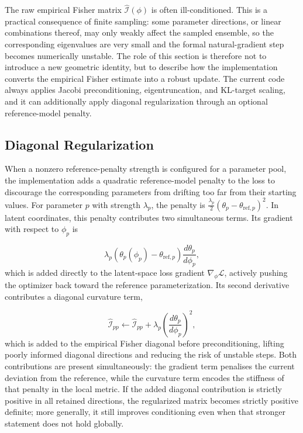 The raw empirical Fisher matrix $\widehat{\mathcal{I}}(\phi)$ is often ill-conditioned. This is a practical consequence of finite sampling: some parameter directions, or linear combinations thereof, may only weakly affect the sampled ensemble, so the corresponding eigenvalues are very small and the formal natural-gradient step becomes numerically unstable. The role of this section is therefore not to introduce a new geometric identity, but to describe how the implementation converts the empirical Fisher estimate into a robust update. The current code always applies Jacobi preconditioning, eigentruncation, and KL-target scaling, and it can additionally apply diagonal regularization through an optional reference-model penalty.

\subsection{Diagonal Regularization}

When a nonzero reference-penalty strength is configured for a parameter pool, the implementation adds a quadratic reference-model penalty to the loss to discourage the corresponding parameters from drifting too far from their starting values. For parameter $p$ with strength $\lambda_p$, the penalty is $\tfrac{\lambda_p}{2}(\theta_p - \theta_{\mathrm{ref},p})^2$. In latent coordinates, this penalty contributes two simultaneous terms. Its gradient with respect to $\phi_p$ is

\begin{equation}
    \lambda_p \left(\theta_p(\phi_p) - \theta_{\mathrm{ref},p}\right) \frac{d\theta_p}{d\phi_p},
    \label{eq:refpengrad}
\end{equation}
%
which is added directly to the latent-space loss gradient $\nabla_\phi \mathcal{L}$, actively pushing the optimizer back toward the reference parameterization. Its second derivative contributes a diagonal curvature term,

\begin{equation}
    \widehat{\mathcal{I}}_{pp} \leftarrow \widehat{\mathcal{I}}_{pp} + \lambda_p \left( \frac{d\theta_p}{d\phi_p} \right)^2,
    \label{eq:refpenfim}
\end{equation}
%
which is added to the empirical Fisher diagonal before preconditioning, lifting poorly informed diagonal directions and reducing the risk of unstable steps. Both contributions are present simultaneously: the gradient term penalises the current deviation from the reference, while the curvature term encodes the stiffness of that penalty in the local metric. If the added diagonal contribution is strictly positive in all retained directions, the regularized matrix becomes strictly positive definite; more generally, it still improves conditioning even when that stronger statement does not hold globally.


